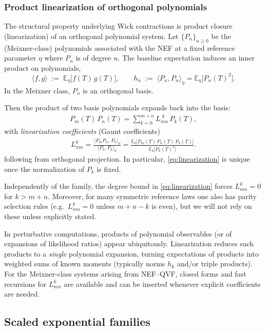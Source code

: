 \documentclass[a4paper,11pt]{article}
\numberwithin{equation}{section}
\theoremstyle{plain}
\theoremstyle{definition}
\theoremstyle{remark}
\newcommand{\1}{\ensuremath{\mathds{1}}\xspace}
\newcommand{\E}{{\ensuremath{{\mathbb{E}}}}\xspace}
\begin{document}
\subsubsection{Product linearization of orthogonal polynomials}
The structural property underlying Wick contractions is product closure (linearization) of an orthogonal polynomial system. Let $\{P_n\}_{n\ge 0}$ be the (Meixner-class)
polynomials associated with the NEF at a fixed reference parameter $\eta$ where $P_n$ is of degree $n$. The baseline expectation induces an inner product on polynomials,
\[
\langle f,g\rangle \;:=\;\E_\eta\big[f(T)\,g(T)\big],
\qquad 
h_n\;:=\;\langle P_n,P_n\rangle_\eta=\E_\eta\big[P_n(T)^2\big].
\]
In the Meixner class, $P_n$ is an orthogonal basis.

Then the product of two basis polynomials expands back into the basis:
\begin{align}
P_m(T)\,P_n(T)
=\sum_{k=0}^{m+n} L_{mn}^{\;k}\,P_k(T),
\label{eq:linearization}
\end{align}
with \emph{linearization coefficients} (Gaunt coefficients)
\begin{align}
L_{mn}^{k}
=\frac{\langle P_m P_n,\,P_k\rangle_0}{\langle P_k,P_k\rangle_0}
=\frac{\E_0\big[P_m(T)\,P_n(T)\,P_k(T)\big]}{\E_0\big[P_k(T)^2\big]}.
\label{eq:linearization-coeff}
\end{align}
following from orthogonal projection. In particular,
\eqref{eq:linearization} is unique once the normalization of $P_k$ is fixed.


Independently of the family, the degree bound in \eqref{eq:linearization} forces $L_{mn}^{k}=0$ for
$k>m+n$. Moreover, for many symmetric reference laws one also has parity selection rules
(e.g.\ $L_{mn}^{k}=0$ unless $m+n-k$ is even), but we will not rely on these unless explicitly stated.

In perturbative computations, products of polynomial observables (or of expansions of likelihood ratios)
appear ubiquitously. Linearization reduces such products to a \emph{single} polynomial expansion, turning
expectations of products into weighted sums of known moments (typically norms $h_k$ and/or triple products).
For the Meixner-class systems arising from NEF--QVF, closed forms and fast recursions for
$L_{mn}^{k}$ are available and can be inserted whenever explicit coefficients are needed.

\subsection{Scaled exponential families}
\end{document}
